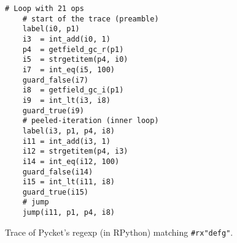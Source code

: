 \begin{figure}[!h]
	\centering

	\begin{minipage}{0.3\textwidth}
		\begin{lstlisting}[language=rptrace, basicstyle=\ttfamily\scriptsize]
    # Loop with 21 ops
    # start of the trace (preamble)
    label(i0, p1)
    i3  = int_add(i0, 1)
    p4  = getfield_gc_r(p1)
    i5  = strgetitem(p4, i0)
    i7  = int_eq(i5, 100)
    guard_false(i7)
    i8  = getfield_gc_i(p1)
    i9  = int_lt(i3, i8)
    guard_true(i9)
    # peeled-iteration (inner loop)
    label(i3, p1, p4, i8)
    i11 = int_add(i3, 1)
    i12 = strgetitem(p4, i3)
    i14 = int_eq(i12, 100)
    guard_false(i14)
    i15 = int_lt(i11, i8)
    guard_true(i15)
    # jump
    jump(i11, p1, p4, i8)
		\end{lstlisting}
	\end{minipage}
\caption{\small Trace of Pycket's regexp (in RPython) matching
		{\tt\#rx"defg"}.}
\label{fig:regexp-example-trace}
\end{figure}